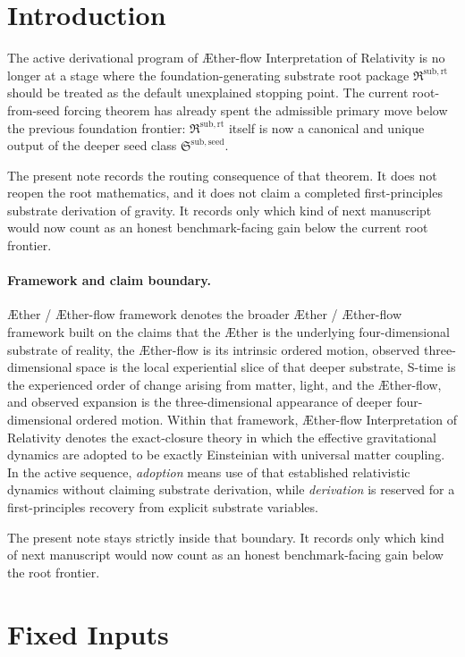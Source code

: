 \documentclass[11pt]{article}
\newcommand{\Aether}{\AE{}ther}
\newcommand{\Aflow}{\AE{}ther-flow}
\newcommand{\TheoryName}{\Aflow{} Interpretation of Relativity}
\newcommand{\TheoryProgram}{\Aether{} / \Aflow{} framework}
\newcommand{\RootPackage}{\mathfrak R^{\mathrm{sub,rt}}}
\newcommand{\SeedPackage}{\mathfrak S^{\mathrm{sub,seed}}}
\begin{document}
\section{Introduction}

The active derivational program of \TheoryName{} is no longer at a stage where the foundation-generating substrate root package \(\RootPackage\) should be treated as the default unexplained stopping point. The current root-from-seed forcing theorem has already spent the admissible primary move below the previous foundation frontier: \(\RootPackage\) itself is now a canonical and unique output of the deeper seed class \(\SeedPackage\).

The present note records the routing consequence of that theorem. It does not reopen the root mathematics, and it does not claim a completed first-principles substrate derivation of gravity. It records only which kind of next manuscript would now count as an honest benchmark-facing gain below the current root frontier.

\paragraph{Framework and claim boundary.}
\TheoryProgram{} denotes the broader \Aether{} / \Aflow{} framework built on the claims that the \Aether{} is the underlying four-dimensional substrate of reality, the \Aflow{} is its intrinsic ordered motion, observed three-dimensional space is the local experiential slice of that deeper substrate, S-time is the experienced order of change arising from matter, light, and the \Aflow{}, and observed expansion is the three-dimensional appearance of deeper four-dimensional ordered motion. Within that framework, \TheoryName{} denotes the exact-closure theory in which the effective gravitational dynamics are adopted to be exactly Einsteinian with universal matter coupling. In the active sequence, \emph{adoption} means use of that established relativistic dynamics without claiming substrate derivation, while \emph{derivation} is reserved for a first-principles recovery from explicit substrate variables.

The present note stays strictly inside that boundary. It records only which kind of next manuscript would now count as an honest benchmark-facing gain below the root frontier.

\section{Fixed Inputs}
\end{document}
